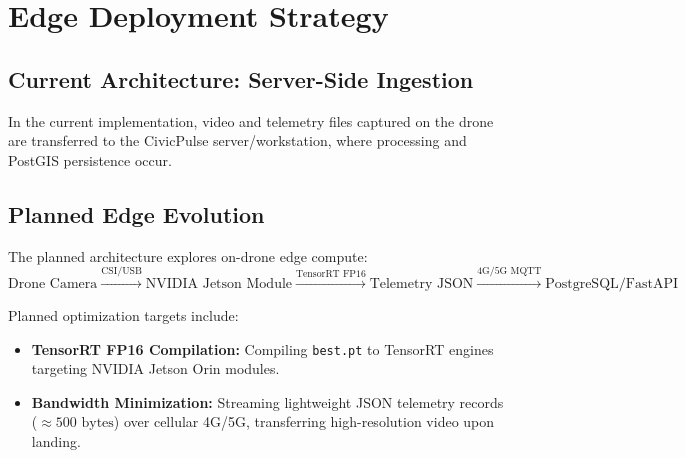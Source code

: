 \documentclass[11pt,a4paper]{article}
\begin{document}
\section{Edge Deployment Strategy}

\subsection{Current Architecture: Server-Side Ingestion}
In the current implementation, video and telemetry files captured on the drone are transferred to the CivicPulse server/workstation, where processing and PostGIS persistence occur.

\subsection{Planned Edge Evolution}
The planned architecture explores on-drone edge compute:
\begin{equation}
\text{Drone Camera} \xrightarrow{\text{CSI/USB}} \text{NVIDIA Jetson Module} \xrightarrow{\text{TensorRT FP16}} \text{Telemetry JSON} \xrightarrow{\text{4G/5G MQTT}} \text{PostgreSQL/FastAPI}
\end{equation}

Planned optimization targets include:
\begin{itemize}[leftmargin=*]
    \item \textbf{TensorRT FP16 Compilation:} Compiling \texttt{best.pt} to TensorRT engines targeting NVIDIA Jetson Orin modules.
    \item \textbf{Bandwidth Minimization:} Streaming lightweight JSON telemetry records ($\approx 500\text{ bytes}$) over cellular 4G/5G, transferring high-resolution video upon landing.
\end{itemize}

\end{document}
